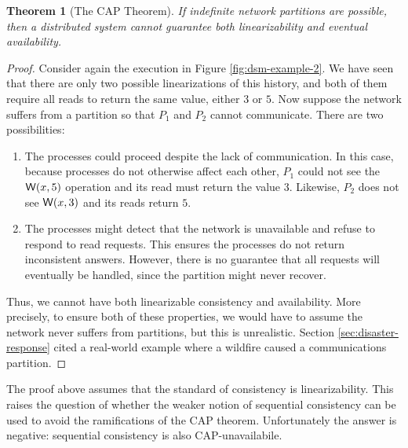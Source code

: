 \documentclass[]             %
{NASA}                       %
\newtheorem{theorem}{Theorem}[section]
\theoremstyle{definition}
\begin{document}
\begin{theorem}[The CAP Theorem]
  \label{thm:cap}
  If indefinite network partitions are possible, then a distributed
  system cannot guarantee both linearizability and
  eventual availability.
\end{theorem}
\begin{proof}
  Consider again the execution in Figure \ref{fig:dsm-example-2}. We have seen
  that there are only two possible linearizations of this history, and
  both of them require all reads to return the same value, either $3$
  or $5$. Now suppose the network suffers from a partition so that
  $P_1$ and $P_2$ cannot communicate. There are two possibilities:
  \begin{enumerate}
  \item The processes could proceed despite the lack of
    communication. In this case, because processes do not otherwise
    affect each other, $P_1$ could not see the $\mathsf{W}\!\left(x, 5\right)$
    operation and its read must return the value $3$. Likewise, $P_2$
    does not see $\mathsf{W}\!\left(x, 3\right)$ and its reads return $5$.
  \item The processes might detect that the network is unavailable and
    refuse to respond to read requests. This ensures the processes do
    not return inconsistent answers. However, there is no guarantee
    that all requests will eventually be handled, since the partition
    might never recover.
  \end{enumerate}

  Thus, we cannot have both linearizable consistency and
  availability. More precisely, to ensure both of these properties, we
  would have to assume the network never suffers from partitions, but
  this is unrealistic. Section \ref{sec:disaster-response} cited a
  real-world example where a wildfire caused a communications
  partition.
\end{proof}


The proof above assumes that the standard of consistency is
linearizability. This raises the question of whether the weaker notion
of sequential consistency can be used to avoid the ramifications of
the CAP theorem. Unfortunately the answer is negative: sequential
consistency is also CAP-unavailabile.
\end{document}
